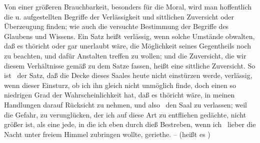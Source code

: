 Von einer größeren Brauchbarkeit, besonders für die Moral, wird man hoffentlich die  u.  aufgestellten Begriffe der Verlässigkeit und sittlichen Zuversicht oder Überzeugung finden; wie auch die  versuchte Bestimmung der Begriffe des Glaubens und Wissens. Ein Satz heißt verlässig, wenn solche Umstände obwalten, daß es thöricht oder gar unerlaubt wäre, die Möglichkeit seines Gegentheils noch zu beachten, und dafür Anstalten treffen zu wollen; und die Zuversicht, die wir diesem Verhältnisse gemäß zu dem Satze fassen, heißt eine sittliche Zuversicht. So ist \zB\ der Satz, daß die Decke dieses Saales heute nicht einstürzen werde, verlässig, wenn dieser Einsturz, ob ich ihn gleich nicht unmöglich finde, doch einen so niedrigen Grad der Wahrscheinlichkeit hat, daß es thöricht wäre, in meinen Handlungen darauf Rücksicht zu nehmen, und also \zB\ den Saal zu verlassen; weil die Gefahr, zu verunglücken, der ich auf diese Art zu entfliehen gedächte, nicht größer ist, als eine jede, in die ich eben durch dieß Bestreben, wenn ich \zB\ lieber die Nacht unter freiem Himmel zubringen wollte, geriethe. --  (heißt es ) 
